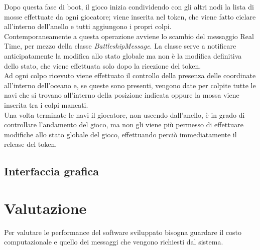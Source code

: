 \documentclass{llncs}
\begin{document}
Dopo questa fase di boot, il gioco inizia condividendo con gli altri nodi la lista di mosse effettuate da ogni giocatore; viene inserita nel token, che viene fatto ciclare all'interno dell'anello e tutti aggiungono i propri colpi.\\ 
Contemporaneamente a questa operazione avviene lo scambio del messaggio Real Time, per mezzo della classe \emph{BattleshipMessage}. La classe serve a notificare anticipatamente la modifica allo stato globale ma non è la modifica definitiva dello stato, che viene effettuata solo dopo la ricezione del token.\\
Ad ogni colpo ricevuto viene effettuato il controllo della presenza delle coordinate all'interno dell'oceano e, se queste sono presenti, vengono date per colpite tutte le navi che si trovano all'interno della posizione indicata oppure la mossa viene inserita tra i colpi mancati.\\
Una volta terminate le navi il giocatore, non uscendo dall'anello, è in grado di controllare l'andamento del gioco, ma non gli viene più permesso di effettuare modifiche allo stato globale del gioco, effettuando perciò immediatamente il release del token.\\
\subsection{Interfaccia grafica}

\section{Valutazione}
Per valutare le performance del software sviluppato bisogna guardare il costo computazionale e quello dei messaggi che vengono richiesti dal sistema.\\
\end{document}
